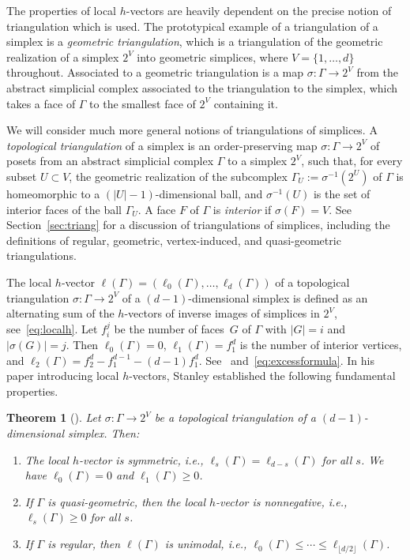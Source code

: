 \documentclass[11pt]{article}
\newtheorem{theo}{Theorem}[section]
\theoremstyle{definition}
\numberwithin{equation}{section}
\numberwithin{equation}{section}
\begin{document}
The properties of local $h$-vectors are heavily dependent on the precise notion of triangulation which is used. The prototypical example of a triangulation of a simplex is a \emph{geometric triangulation}, which is a triangulation of the geometric realization of a simplex $2^V$ into geometric simplices, where $V = \{ 1,\ldots, d\}$ throughout. 
Associated to a geometric triangulation is a map $\sigma \colon \Gamma \to 2^V$ from the abstract simplicial complex associated to the triangulation to the simplex, which takes a face of $\Gamma$ to the smallest face of $2^V$ containing it. 

We will consider much more general notions of triangulations of simplices. 
A \emph{topological triangulation} of a simplex is an order-preserving  map $\sigma \colon \Gamma \to 2^V$ of posets from an abstract simplicial complex $\Gamma$ to a simplex $2^V$, such that, for every subset $U \subset V$, 
the geometric realization of the subcomplex $\Gamma_U := \sigma^{-1}(2^U)$ of $\Gamma$ is homeomorphic to a $(|U| - 1)$-dimensional ball, and $\sigma^{-1}(U)$ is the set of interior faces of the ball $\Gamma_U$. 
A face $F$ of $\Gamma$ is \emph{interior} if $\sigma(F) = V$. 
See Section~\ref{sec:triang} for a discussion of triangulations of simplices, including the definitions of regular, geometric, vertex-induced, and quasi-geometric triangulations. 

The {local $h$-vector} $\ell(\Gamma) = (\ell_0(\Gamma), \dotsc, \ell_d(\Gamma))$ of a topological triangulation \mbox{$\sigma \colon \Gamma \to 2^V$} of a $(d-1)$-dimensional simplex is defined as an alternating sum of the $h$-vectors of inverse images of simplices in $2^V$, see~\eqref{eq:localh}. 
Let $f_i^j$ be the number of faces~$G$ of $\Gamma$ with $|G| = i$ and $|\sigma(G)| = j$. Then $\ell_0(\Gamma) = 0$, $\ell_1(\Gamma) = f_1^d$ is the number of interior vertices, and $\ell_2(\Gamma) = f_2^d - f_1^{d-1} - (d-1)f_1^{d}$. See~\cite[Example 2.3]{Stanleylocalh} and~\eqref{eq:excessformula}. In his paper introducing local $h$-vectors, Stanley established the following fundamental properties. 

\begin{theo}[\cite{Stanleylocalh}]\label{thm:localhstructure}
Let $\sigma \colon \Gamma \to 2^V$ be a topological triangulation of a $(d-1)$-dimensional simplex. Then:
\begin{enumerate}
\item The local $h$-vector is symmetric, i.e., $\ell_s(\Gamma) = \ell_{d-s}(\Gamma)$ for all $s$. We have $\ell_0(\Gamma) = 0$ and $\ell_1(\Gamma) \ge 0$.
\item If $\Gamma$ is quasi-geometric, then the local $h$-vector is nonnegative, i.e., $\ell_s(\Gamma) \ge 0$ for all $s$. 
\item If $\Gamma$ is regular, then $\ell(\Gamma)$ is unimodal, i.e., $\ell_0(\Gamma) \le \dotsb \le \ell_{\lfloor d/2 \rfloor}(\Gamma)$. 
\end{enumerate}
\end{theo}
\end{document}
